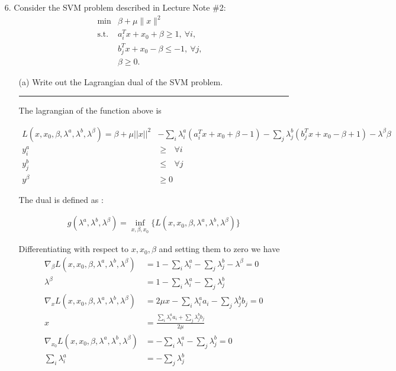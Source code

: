 \documentclass{article} %
\begin{document}
\begin{enumerate}
\item[6.] Consider the SVM problem described in Lecture Note \#2:
\[ 
\begin{array}{rrl} 
&\min &  \beta+\mu\|x\|^2\\ 
&\mbox{s.t.}& a_i^Tx+x_0+\beta\ge 1,\ \forall i,\\ 
& & b_j^Tx+x_0-\beta\le -1,\ \forall j,\\
& & \beta \ge 0.
\end{array} 
\]
\begin{itemize}
\item[(a)] Write out the Lagrangian dual of the SVM problem.


\rule{\textwidth}{1pt}


The lagrangian of the function above  is 

\begin{equation*}
\begin{aligned}
L(x, x_0, \beta, \lambda^a, \lambda^b, \lambda^{\beta}) = \beta + \mu ||x||^2 &- \sum_i \lambda_i^a (a_i^T x + x_0 + \beta - 1) -  \sum_j \lambda_j^b ( b_j^T x + x_0 - \beta + 1 ) - \lambda^{\beta} \beta \\ 
y_i^{a} &\geq \mbox{ } \forall i \\ 
y_j^{b} &\leq \mbox{ } \forall j \\ 
y^{\beta} &\geq 0 \mbox{ } 
\end{aligned}
\end{equation*}

The dual is defined as :

\begin{equation*}
\begin{aligned}
g(\lambda^a, \lambda^b, \lambda^{\beta}) = \inf_{x, \beta, x_0} \{ L(x, x_0, \beta, \lambda^a, \lambda^b, \lambda^{\beta}) \}
\end{aligned}
\end{equation*}

Differentiating with respect to $x, x_0, \beta$ and setting them to zero we have 
\begin{equation*}
\begin{aligned}
\nabla_{\beta} L(x, x_0, \beta, \lambda^a, \lambda^b, \lambda^{\beta}) &= 1 - \sum_i \lambda_i^a - \sum_j \lambda_j^b - \lambda^\beta = 0 \\ 
\lambda^\beta &= 1 - \sum_i \lambda_i^a - \sum_j \lambda_j^b  \\ 
\nabla_{x} L(x, x_0, \beta, \lambda^a, \lambda^b, \lambda^{\beta}) &= 2 \mu x - \sum_i \lambda_i^a a_i - \sum_j \lambda_j^b b_j = 0  \\ 
 x &= \frac{\sum_i \lambda_i^a a_i + \sum_j \lambda_j^b b_j}{2\mu} \\ 
\nabla_{x_0} L(x, x_0, \beta, \lambda^a, \lambda^b, \lambda^{\beta}) &= - \sum_i \lambda_i^a   - \sum_j \lambda_j^b  = 0\\
\sum_i \lambda_i^a  &=  - \sum_j \lambda_j^b 
\end{aligned}
\end{equation*}



\end{itemize}
\end{enumerate}
\end{document}
